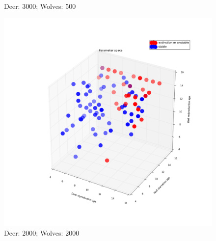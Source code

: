 \documentclass{beamer}
\begin{document}
{\begin{figure}[ht]
\begin{minipage}[b]{.3\linewidth}
                \caption{\tiny{Deer: 3000; Wolves: 500}}
                \end{minipage}
                \begin{minipage}[b]{.3\linewidth}
                        \includegraphics[width = 1\linewidth]{./pics/Restricted_Parameter_space_d2000_w2000.png}
                    \caption{\tiny{Deer: 2000; Wolves: 2000}}
                \end{minipage}

  \end{figure}

}
\end{document}
